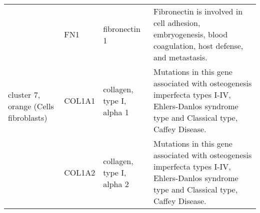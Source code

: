 \begin{table}[htp]
\begin{center}
\begin{tabular}{|p{0.7in}|p{0.5in}|p{1.4in}|p{3.6in}|}
 \hline
 \multirow{3}{4em}{\small{cluster 7, orange (Cells fibroblasts)}} & \small{FN1}  & \footnotesize{fibronectin 1} & \scriptsize{Fibronectin is involved in cell adhesion, embryogenesis, blood coagulation, host defense, and metastasis.} \\
 					      & \small{COL1A1} & \footnotesize{collagen, type I, alpha 1} & \scriptsize{Mutations in this gene associated with osteogenesis imperfecta types I-IV, Ehlers-Danlos syndrome type and Classical type, Caffey Disease}. \\
					      & \small{COL1A2} & \footnotesize{collagen, type I, alpha 2} & \scriptsize{Mutations in this gene associated with osteogenesis imperfecta types I-IV, Ehlers-Danlos syndrome type and Classical type, Caffey Disease}. \\
\hline
\end{tabular}
\end{center}
\end{table}


